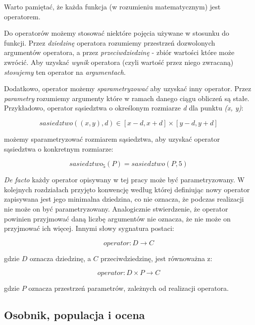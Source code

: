 \documentclass[twoside]{iisthesis}
\newcommand{\Defacto}{\emph{De facto }}
\begin{document}
Warto pamiętać, że każda funkcja (w rozumieniu matematycznym) jest operatorem.

Do operatorów możemy stosować niektóre pojęcia używane w stosunku do funkcji. Przez \emph{dziedzinę} operatora rozumiemy przestrzeń dozwolonych argumentów operatora, a przez \emph{przeciwdziedzinę} - zbiór wartości które może zwrócić. Aby uzyskać \emph{wynik} operatora (czyli wartość przez niego zwracaną) \emph{stosujemy} ten operator na \emph{argumentach}.

Dodatkowo, operator możemy \emph{sparametryzować} aby uzyskać inny operator. Przez \emph{parametry} rozumiemy argumenty które w ramach danego ciągu obliczeń są stałe. Przykładowo, operator sąsiedztwa o określonym rozmiarze \emph{d} dla punktu \emph{(x, y)}:

\begin{displaymath}
	sasiedztwo((x, y), d) \in [x-d, x+d] \times [y-d, y+d]
\end{displaymath}

możemy sparametryzować rozmiarem sąsiedztwa, aby uzyskać operator sąsiedztwa o konkretnym rozmiarze:

\begin{displaymath}
sasiedztwo_5 (P) = sasiedztwo (P, 5)
\end{displaymath}

\Defacto każdy operator opisywany w tej pracy może być parametryzowany. W kolejnych rozdziałach przyjęto konwencję według której definiując nowy operator zapisywana jest jego minimalna dziedzina, co nie oznacza, że podczas realizacji nie może on być parametryzowany. Analogicznie stwierdzenie, że operator powinien przyjmować daną liczbę argumentów nie oznacza, że nie może on przyjmować ich więcej. Innymi słowy sygnatura postaci:

\begin{displaymath}
operator: D \rightarrow C
\end{displaymath}

gdzie $D$ oznacza dziedzinę, a $C$ przeciwdziedzinę, jest równoważna z:

\begin{displaymath}
operator: D \times P \rightarrow C
\end{displaymath}

gdzie $P$ oznacza przestrzeń parametrów, zależnych od realizacji operatora.

\subsection{Osobnik, populacja i ocena}
\end{document}
